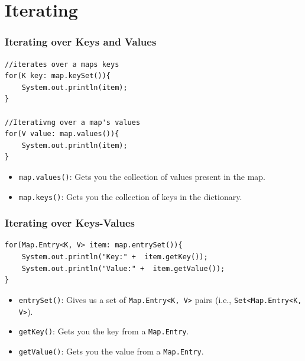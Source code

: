 \documentclass{beamer}
\begin{document}
\section{Iterating}
\begin{frame}[fragile]
    \frametitle{Iterating over Keys and Values}
    \begin{lstlisting}[frame=trBL]
//iterates over a maps keys
for(K key: map.keySet()){
    System.out.println(item);
}

//Iterativng over a map's values
for(V value: map.values()){
    System.out.println(item);
}
    \end{lstlisting}
    \vfill
    \begin{itemize}
        \item \lstinline|map.values()|: Gets you the collection of values present in the map.
        \item \lstinline|map.keys()|: Gets you the collection of keys in the dictionary.
    \end{itemize}
\end{frame}

\begin{frame}[fragile]
    \frametitle{Iterating over Keys-Values}
    \begin{lstlisting}[frame=trBL]
for(Map.Entry<K, V> item: map.entrySet()){
    System.out.println("Key:" +  item.getKey());
    System.out.println("Value:" +  item.getValue());
}
    \end{lstlisting}
    \vfill
    \begin{itemize}
        \item \lstinline|entrySet()|: Gives us a set of \lstinline|Map.Entry<K, V>| pairs (i.e., \lstinline|Set<Map.Entry<K, V>|).
        \item \lstinline|getKey()|: Gets you the key from a \lstinline|Map.Entry|.
        \item \lstinline|getValue()|: Gets you the value from a \lstinline|Map.Entry|.
    \end{itemize}
\end{frame}
\end{document}
